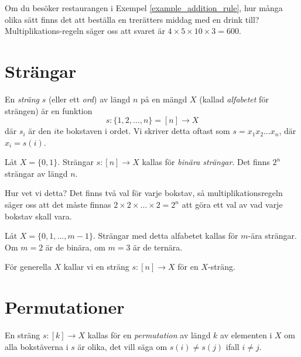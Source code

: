 \documentclass{tufte-handout}
\begin{document}
\begin{example}
	Om du besöker restaurangen i Exempel \ref{example_addition_rule}, hur många olika sätt finns det att beställa en trerätters middag med en drink till?
 Multiplikations-regeln säger oss att svaret är $4\times 5\times 10\times 3 = 600$.
\end{example}

\section{Strängar}

\begin{definition}
En \emph{sträng} $s$ (eller ett \emph{ord}) av längd $n$ på en mängd $X$ (kallad \emph{alfabetet} för strängen) är en funktion
$$s: \{1, 2, \ldots, n\} = [n] \to X$$
där $s_i$ är den $i$te bokstaven i ordet.
Vi skriver detta oftast som $s = x_1x_2\ldots x_n$, där $x_i = s(i)$.
\end{definition}

\begin{example}
Låt $X = \{0,1\}$. Strängar $s: [n] \to X$ kallas för \emph{binära strängar}. Det finns $2^n$ strängar av längd $n$.

Hur vet vi detta? Det finns två val för varje bokstav, så multiplikationsregeln säger oss att det måste finnas $2\times 2\times\ldots\times 2 = 2^n$ att göra ett val av vad varje bokstav skall vara.
\end{example}

\begin{example}
Låt $X = \{0,1,\ldots,m-1\}$. Strängar med detta alfabetet kallas för $m$-ära strängar. Om $m = 2$ är de binära, om $m = 3$ är de ternära. 
\end{example}

För generella $X$ kallar vi en sträng $s: [n] \to X$ för en $X$-sträng.

\section{Permutationer}

\begin{definition}
En sträng $s: [k] \to X$ kallas för en \emph{permutation} av längd $k$ av elementen i $X$ om alla bokstäverna i $s$ är olika, det vill säga om $s(i) \neq s(j)$ ifall $i \neq j$.
\end{definition}
\end{document}
